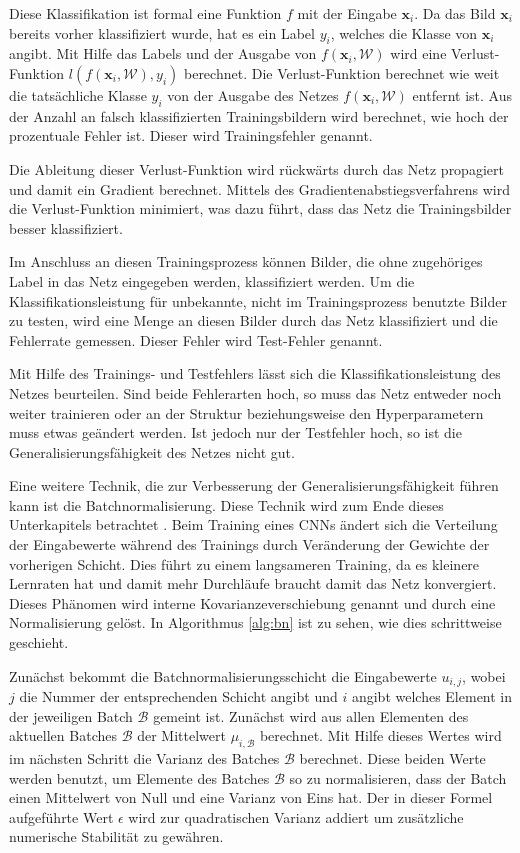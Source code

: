 Diese Klassifikation ist formal eine Funktion $f$ mit der Eingabe $\mathbf{x}_i$. Da das Bild $\mathbf{x}_i$ bereits vorher klassifiziert wurde, hat es ein Label $y_i$, welches die Klasse von $\mathbf{x}_i$ angibt. Mit Hilfe das Labels und der Ausgabe von $f(\mathbf{x}_i, \mathcal{W})$ wird eine Verlust-Funktion $l(f(\mathbf{x}_i,\mathcal{W}),y_i)$ berechnet. Die Verlust-Funktion berechnet wie weit die tatsächliche Klasse $y_i$ von der Ausgabe des Netzes $f(\mathbf{x}_i, \mathcal{W})$ entfernt ist. Aus der Anzahl an falsch klassifizierten Trainingsbildern wird berechnet, wie hoch der prozentuale Fehler ist. Dieser wird Trainingsfehler genannt.


Die Ableitung dieser Verlust-Funktion wird rückwärts durch das Netz propagiert und damit ein Gradient berechnet. Mittels des Gradientenabstiegsverfahrens wird die Verlust-Funktion minimiert, was dazu führt, dass das Netz die Trainingsbilder besser klassifiziert. 


Im Anschluss an diesen Trainingsprozess können Bilder, die ohne zugehöriges Label in das Netz eingegeben werden, klassifiziert werden. Um die Klassifikationsleistung für unbekannte, nicht im Trainingsprozess benutzte Bilder zu testen, wird eine Menge an diesen Bilder durch das Netz klassifiziert und die Fehlerrate gemessen. Dieser Fehler wird Test-Fehler genannt. 


Mit Hilfe des Trainings- und Testfehlers lässt sich die Klassifikationsleistung des Netzes beurteilen. Sind beide Fehlerarten hoch, so muss das Netz entweder noch weiter trainieren oder an der Struktur beziehungsweise den Hyperparametern muss etwas geändert werden. Ist jedoch nur der Testfehler hoch, so ist die Generalisierungsfähigkeit des Netzes nicht gut. 

Eine weitere Technik, die zur Verbesserung der Generalisierungsfähigkeit führen kann ist die Batchnormalisierung. Diese Technik wird zum Ende dieses Unterkapitels betrachtet \cite{batchnorm}. Beim Training eines CNNs ändert sich die Verteilung der Eingabewerte während des Trainings durch Veränderung der Gewichte der vorherigen Schicht. Dies führt zu einem langsameren Training, da es kleinere Lernraten hat und damit mehr Durchläufe braucht damit das Netz konvergiert. Dieses Phänomen wird interne Kovarianzeverschiebung genannt und durch eine Normalisierung gelöst. In Algorithmus \ref{alg:bn} ist zu sehen, wie dies schrittweise geschieht.


Zunächst bekommt die Batchnormalisierungsschicht die Eingabewerte $u_{i,j}$, wobei $j$ die Nummer der entsprechenden Schicht angibt und $i$ angibt welches Element in der jeweiligen Batch $\mathcal{B}$ gemeint ist. Zunächst wird aus allen Elementen des aktuellen Batches $\mathcal{B}$ der Mittelwert $\mu_{i,\mathcal{B}}$ berechnet. Mit Hilfe dieses Wertes wird im nächsten Schritt die Varianz des Batches $\mathcal{B}$ berechnet. Diese beiden Werte werden benutzt, um Elemente des Batches $\mathcal{B}$ so zu normalisieren, dass der Batch einen Mittelwert von Null und eine Varianz von Eins hat. Der in dieser Formel aufgeführte Wert $\epsilon$ wird zur quadratischen Varianz addiert um zusätzliche numerische Stabilität zu gewähren. 


